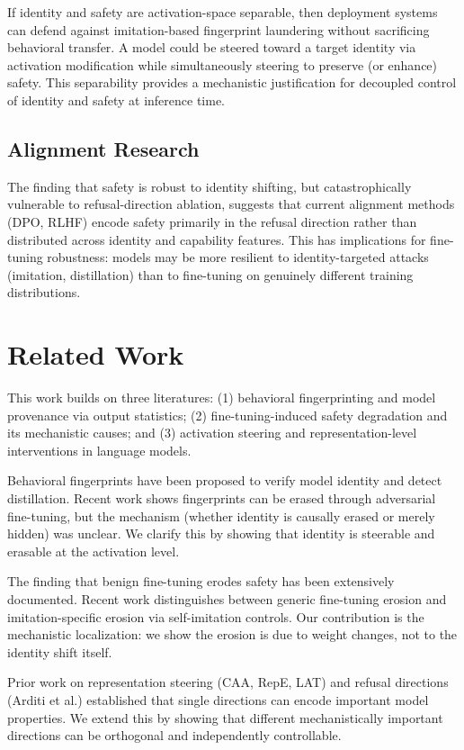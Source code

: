 \documentclass[letterpaper,twocolumn]{article}
\begin{document}
If identity and safety are activation-space separable, then deployment systems can defend against imitation-based fingerprint laundering without sacrificing behavioral transfer. A model could be steered toward a target identity via activation modification while simultaneously steering to preserve (or enhance) safety. This separability provides a mechanistic justification for decoupled control of identity and safety at inference time.

\subsection{Alignment Research}

The finding that safety is robust to identity shifting, but catastrophically vulnerable to refusal-direction ablation, suggests that current alignment methods (DPO, RLHF) encode safety primarily in the refusal direction rather than distributed across identity and capability features. This has implications for fine-tuning robustness: models may be more resilient to identity-targeted attacks (imitation, distillation) than to fine-tuning on genuinely different training distributions.

\section{Related Work}

This work builds on three literatures: (1) behavioral fingerprinting and model provenance via output statistics; (2) fine-tuning-induced safety degradation and its mechanistic causes; and (3) activation steering and representation-level interventions in language models.

Behavioral fingerprints have been proposed to verify model identity and detect distillation. Recent work shows fingerprints can be erased through adversarial fine-tuning, but the mechanism (whether identity is causally erased or merely hidden) was unclear. We clarify this by showing that identity is steerable and erasable at the activation level.

The finding that benign fine-tuning erodes safety has been extensively documented. Recent work distinguishes between generic fine-tuning erosion and imitation-specific erosion via self-imitation controls. Our contribution is the mechanistic localization: we show the erosion is due to weight changes, not to the identity shift itself.

Prior work on representation steering (CAA, RepE, LAT) and refusal directions (Arditi et al.) established that single directions can encode important model properties. We extend this by showing that different mechanistically important directions can be orthogonal and independently controllable.
\end{document}
